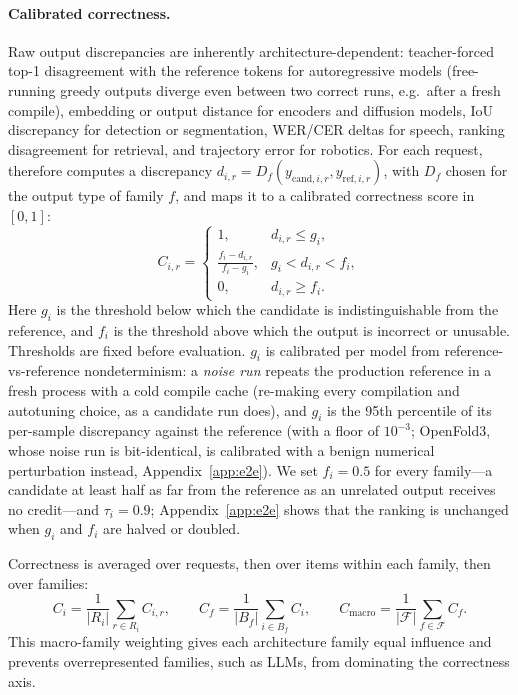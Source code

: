 \paragraph{Calibrated correctness.}
Raw output discrepancies are inherently architecture-dependent: teacher-forced top-1 disagreement with the reference tokens for autoregressive models (free-running greedy outputs diverge even between two correct runs, e.g.\ after a fresh compile), embedding or output distance for encoders and diffusion models, IoU discrepancy for detection or segmentation, WER/CER deltas for speech, ranking disagreement for retrieval, and trajectory error for robotics.
For each request, \fastkernels{} therefore computes a discrepancy $d_{i,r} = D_f(y_{\mathrm{cand},i,r}, y_{\mathrm{ref},i,r})$, with $D_f$ chosen for the output type of family $f$, and maps it to a calibrated correctness score in $[0,1]$:
\begin{equation}
C_{i,r} =
\begin{cases}
1, & d_{i,r} \le g_i, \\
\frac{f_i - d_{i,r}}{f_i - g_i}, & g_i < d_{i,r} < f_i, \\
0, & d_{i,r} \ge f_i.
\end{cases}
\end{equation}
Here $g_i$ is the threshold below which the candidate is indistinguishable from the reference, and $f_i$ is the threshold above which the output is incorrect or unusable.
Thresholds are fixed before evaluation. $g_i$ is calibrated per model from reference-vs-reference nondeterminism: a \emph{noise run} repeats the production reference in a fresh process with a cold compile cache (re-making every compilation and autotuning choice, as a candidate run does), and $g_i$ is the 95th percentile of its per-sample discrepancy against the reference (with a floor of $10^{-3}$; OpenFold3, whose noise run is bit-identical, is calibrated with a benign numerical perturbation instead, Appendix~\ref{app:e2e}).
We set $f_i = 0.5$ for every family---a candidate at least half as far from the reference as an unrelated output receives no credit---and $\tau_i = 0.9$; Appendix~\ref{app:e2e} shows that the ranking is unchanged when $g_i$ and $f_i$ are halved or doubled.

Correctness is averaged over requests, then over items within each family, then over families:
\begin{equation}
C_i = \frac{1}{|R_i|}\sum_{r \in R_i} C_{i,r},
\qquad
C_f = \frac{1}{|B_f|}\sum_{i \in B_f} C_i,
\qquad
C_{\mathrm{macro}} = \frac{1}{|\mathcal{F}|}\sum_{f \in \mathcal{F}} C_f.
\end{equation}
This macro-family weighting gives each architecture family equal influence and prevents overrepresented families, such as LLMs, from dominating the correctness axis.

